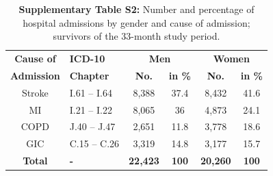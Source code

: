 \begin{table}[htbp]
  \centering
  \caption*{\textbf{Supplementary Table S2:}	Number and percentage of hospital admissions
  												by gender and cause of admission; survivors of 
  												the 33-month study period.}
    \begin{tabular}{cp{6.57em}cccc}
    \toprule
    \textbf{Cause of } & \textbf{ICD-10} & \multicolumn{2}{c}{\textbf{Men }} & \multicolumn{2}{c}{\textbf{Women }} \\
    \textbf{Admission} & \textbf{Chapter} & \textbf{No.} & \textbf{in \%} & \textbf{No. } & \textbf{in \%} \\
    \midrule
    Stroke  & I.61 -- I.64 & 8,388 & 37.4  & 8,432 & 41.6 \\
    MI    & I.21 -- I.22 & 8,065 & 36    & 4,873 & 24.1 \\
    COPD  & J.40 -- J.47 & 2,651 & 11.8  & 3,778 & 18.6 \\
    GIC   & C.15 -- C.26 & 3,319 & 14.8  & 3,177 & 15.7 \\
    \midrule
    \textbf{Total} & \textbf{-} & \textbf{22,423} & \textbf{100} & \textbf{20,260} & \textbf{100} \\
    \bottomrule
    \end{tabular}%
\label{ch3:tabS2}
\end{table}%





